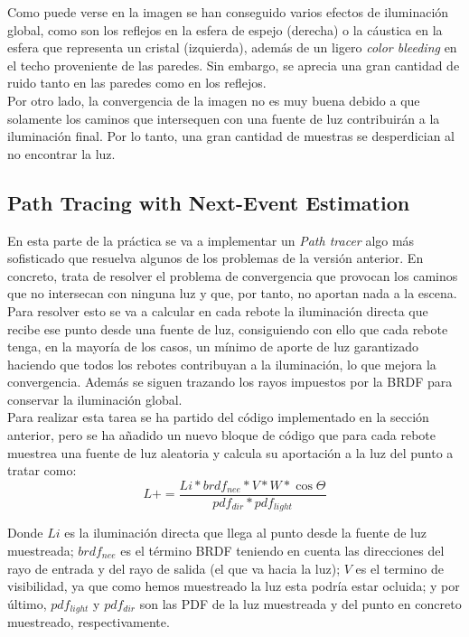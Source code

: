 \documentclass[10pt,oneside,a4paper]{article}
\begin{document}
Como puede verse en la imagen se han conseguido varios efectos de iluminación global, como son los reflejos en la esfera de espejo (derecha) o la cáustica en la esfera que representa un cristal (izquierda), además de un ligero \textit{color bleeding} en el techo proveniente de las paredes. Sin embargo, se aprecia una gran cantidad de ruido tanto en las paredes como en los reflejos.\\

Por otro lado, la convergencia de la imagen no es muy buena debido a que solamente los caminos que intersequen con una fuente de luz contribuirán a la iluminación final. Por lo tanto, una gran cantidad de muestras se desperdician al no encontrar la luz.

\subsection{Path Tracing with Next-Event Estimation}
En esta parte de la práctica se va a implementar un \textit{Path tracer} algo más sofisticado que resuelva algunos de los problemas de la versión anterior. En concreto, trata de resolver el problema de convergencia que provocan los caminos que no intersecan con ninguna luz y que, por tanto, no aportan nada a la escena. Para resolver esto se va a calcular en cada rebote la iluminación directa que recibe ese punto desde una fuente de luz, consiguiendo con ello que cada rebote tenga, en la mayoría de los casos, un mínimo de aporte de luz garantizado haciendo que todos los rebotes contribuyan a la iluminación, lo que mejora la convergencia. Además se siguen trazando los rayos impuestos por la BRDF para conservar la iluminación global.\\

Para realizar esta tarea se ha partido del código implementado en la sección anterior, pero se ha añadido un nuevo bloque de código que para cada rebote muestrea una fuente de luz aleatoria y calcula su aportación a la luz del punto a tratar como:
$$ L += \frac{Li * brdf_{nee} * V * W * \cos\Theta}{pdf_{dir} * pdf_{light}}$$

Donde $Li$ es la iluminación directa que llega al punto desde la fuente de luz muestreada; $brdf_{nee}$ es el término BRDF teniendo en cuenta las direcciones del rayo de entrada y del rayo de salida (el que va hacia la luz); $V$ es el termino de visibilidad, ya que como hemos muestreado la luz esta podría estar ocluida; y por último, $pdf_{light}$ y $pdf_{dir}$ son las PDF de la luz muestreada y del punto en concreto muestreado, respectivamente. \\
\end{document}

